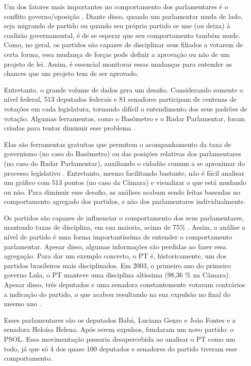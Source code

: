 Um dos fatores mais importantes no comportamento dos parlamentares é o conflito
governo/oposição \cite{Leoni2002,Desposato2005b,Freitas2012,Izumi2013}. Diante
disso, quando um parlamentar muda de lado, seja migrando de partido ou quando
seu próprio partido se une (ou deixa) à coalizão governamental, é de se esperar
que seu comportamento também mude. Como, no geral, os partidos são capazes de
disciplinar seus filiados a votarem de certa forma, essa mudança de forças pode
definir a aprovação ou não de um projeto de lei. Assim, é essencial monitorar
essas mudanças para entender as chances que um projeto tem de ser aprovado.

Entretanto, o grande volume de dados gera um desafio. Considerando somente o
nível federal, 513 deputados federais e 81 senadores participam de centenas de
votações em cada legislatura, tornando difícil o entendimento dos seus padrões
de votação. Algumas ferramentas, como o Basômetro e o Radar Parlamentar, foram
criadas para tentar diminuir esse problema \cite{Estadao2012,Trento2013}.

Elas são ferramentas gratuitas que permitem o acompanhamento da taxa de
governismo (no caso do Basômetro) ou das posições relativas dos parlamentares
(no caso do Radar Parlamentar), auxiliando o cidadão comum a se aproximar do
processo legislativo \cite{Dantas2014}. Entretanto, mesmo facilitando bastante,
não é fácil analisar um gráfico com 513 pontos (no caso da Câmara) e visualizar
o que está mudando ou não. Para diminuir esse desafio, as análises acabam sendo
feitas baseadas no comportamento agregado dos partidos, e não dos parlamentares
individualmente.

Os partidos são capazes de influenciar o comportamento dos seus parlamentares,
mantendo taxas de disciplina, em sua maioria, acima de 75\%
\cite{Figueiredo2001,Cheibub2009,Zucco2009}. Assim, a análise a nível de partido
é uma forma importantíssima de entender o comportamento parlamentar. Apesar
disso, algumas informações são perdidas ao fazer essa agregação. Para dar um
exemplo concreto, o \gls{PT} é, historicamente, um dos partidos brasileiros mais
disciplinados. Em 2003, o primeiro ano do primeiro governo Lula, o \gls{PT} manteve uma
disciplina altíssima (98,36 \% na Câmara). Apesar disso, três deputados e uma
senadora constantemente votavam contrários a indicação do partido, o que acabou
resultando na sua expulsão no final do mesmo ano \cite{Breve2013}.

Esses parlamentares são os deputados Babá, Luciana Genro e João Fontes e a
senadora Heloísa Helena. Após serem expulsos, fundaram um novo partido: o
\gls{PSOL}. Essa movimentação passaria desapercebida ao analisar o \gls{PT}
como um todo, já que só 4 dos quase 100 deputados e senadores do partido
tiveram esse comportamento.

